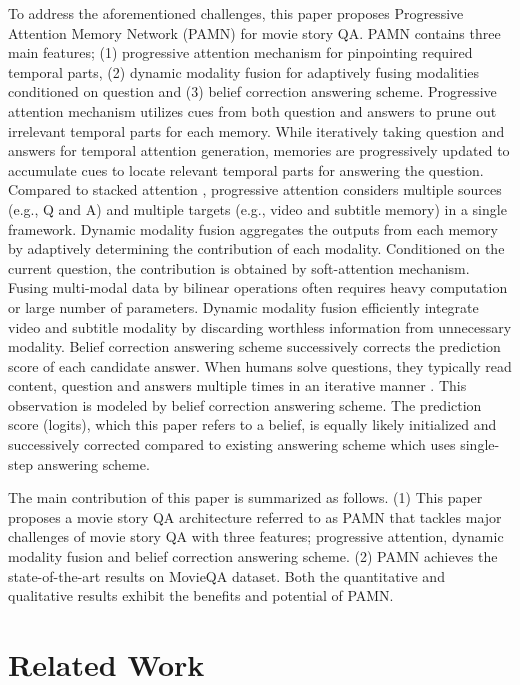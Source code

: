 \documentclass[10pt,twocolumn,letterpaper]{article}
\begin{document}
To address the aforementioned challenges, this paper proposes Progressive Attention Memory Network (PAMN) for movie story QA. PAMN contains three main features; (1) progressive attention mechanism for pinpointing required temporal parts, (2) dynamic modality fusion for adaptively fusing modalities conditioned on question and (3) belief correction answering scheme. Progressive attention mechanism utilizes cues from both question and answers to prune out irrelevant temporal parts for each memory. While iteratively taking question and answers for temporal attention generation, memories are progressively updated to accumulate cues to locate relevant temporal parts for answering the question. Compared to stacked attention \cite{Fan_2018_CVPR,SAN}, progressive attention considers multiple sources (e.g., Q and A) and multiple targets (e.g., video and subtitle memory) in a single framework. 
Dynamic modality fusion aggregates the outputs from each memory by adaptively determining the contribution of each modality. Conditioned on the current question, the contribution is obtained by soft-attention mechanism. Fusing multi-modal data by bilinear operations \cite{mutan,mcb, MLB} often requires heavy computation or large number of parameters. Dynamic modality fusion efficiently integrate video and subtitle modality by discarding worthless information from unnecessary modality.
Belief correction answering scheme successively corrects the prediction score of each candidate answer. When humans solve questions, they typically read content, question and answers multiple times in an iterative manner \cite{human}. This observation is modeled by belief correction answering scheme. The prediction score (logits), which this paper refers to a belief, is equally likely initialized and successively corrected compared to existing answering scheme \cite{mdam,rwmn,lmn} which uses single-step answering scheme.


The main contribution of this paper is summarized as follows. (1) This paper proposes a movie story QA architecture referred to as PAMN that tackles major challenges of movie story QA with three features; progressive attention, dynamic modality fusion and belief correction answering scheme. (2) PAMN achieves the state-of-the-art results on MovieQA dataset. Both the quantitative and qualitative results exhibit the benefits and potential of PAMN.


\section{Related Work}
\label{sec:2}
\end{document}
